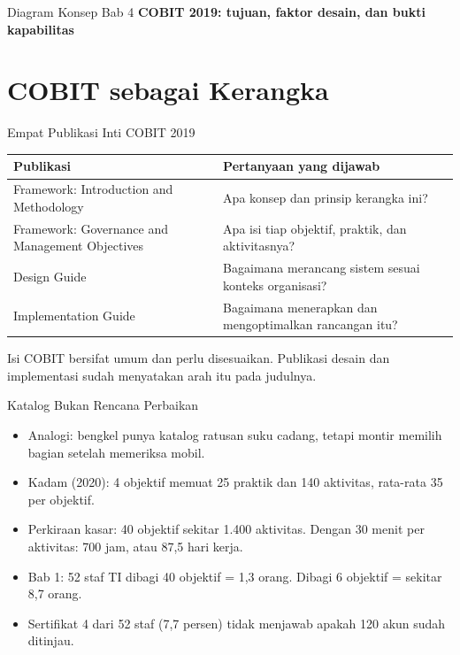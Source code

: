 \documentclass[aspectratio=169, table, 12pt]{beamer}
\begin{document}
\begin{frame}{{\Large Diagram Konsep Bab 4}}
  \centering
  {\small\bfseries COBIT 2019: tujuan, faktor desain, dan bukti kapabilitas}\par\medskip
  \label{fig:session04-ilustrasi-bab}
\end{frame}

\section{COBIT sebagai Kerangka}

\begin{frame}{{\Large Empat Publikasi Inti COBIT 2019}}
  \vspace{4pt}
  \footnotesize
  \begin{tabularx}{\textwidth}{|>{\raggedright\arraybackslash}p{}|>{\raggedright\arraybackslash}X|}
    \hline
    \textbf{Publikasi} & \textbf{Pertanyaan yang dijawab} \\ \hline
    Framework: Introduction and Methodology & Apa konsep dan prinsip kerangka ini? \\ \hline
    Framework: Governance and Management Objectives & Apa isi tiap objektif, praktik, dan aktivitasnya? \\ \hline
    Design Guide & Bagaimana merancang sistem sesuai konteks organisasi? \\ \hline
    Implementation Guide & Bagaimana menerapkan dan mengoptimalkan rancangan itu? \\ \hline
  \end{tabularx}

  \vspace{8pt}
  \small Isi COBIT bersifat umum dan perlu disesuaikan. Publikasi desain dan implementasi sudah menyatakan
  arah itu pada judulnya.
\end{frame}

\begin{frame}{{\Large Katalog Bukan Rencana Perbaikan}}
  \vspace{4pt}
  \small
  \begin{itemize}
    \item Analogi: bengkel punya katalog ratusan suku cadang, tetapi montir memilih bagian setelah memeriksa mobil.
    \item Kadam (2020): 4 objektif memuat 25 praktik dan 140 aktivitas, rata-rata 35 per objektif.
    \item Perkiraan kasar: 40 objektif sekitar 1.400 aktivitas. Dengan 30 menit per aktivitas: 700 jam, atau 87,5 hari kerja.
    \item Bab 1: 52 staf TI dibagi 40 objektif = 1,3 orang. Dibagi 6 objektif = sekitar 8,7 orang.
    \item Sertifikat 4 dari 52 staf (7,7 persen) tidak menjawab apakah 120 akun sudah ditinjau.
  \end{itemize}
\end{frame}
\end{document}
